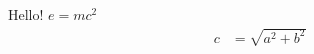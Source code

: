 \documentclass{article}
\begin{document}
Hello! $e=mc^2$
\begin{align}
c&=\sqrt{a^2+b^2}
\end{align}
\begin{center}
\end{center}
\end{document}
